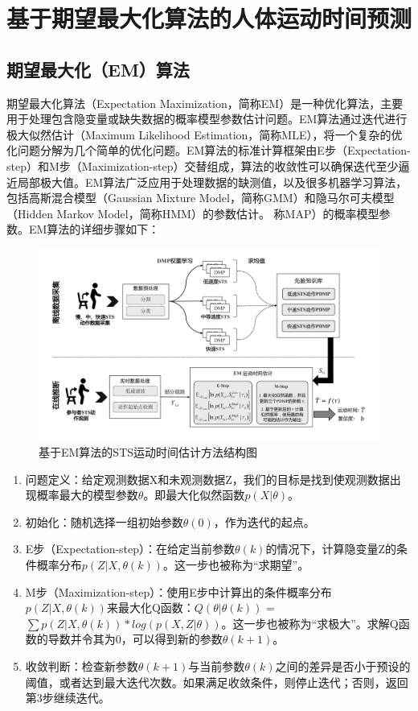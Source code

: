 \section{基于期望最大化算法的人体运动时间预测}
\subsection{期望最大化（EM）算法}
期望最大化算法（Expectation Maximization，简称EM）是一种优化算法，主要用于处理包含隐变量或缺失数据的概率模型参数估计问题。EM算法通过迭代进行极大似然估计（Maximum Likelihood Estimation，简称MLE），将一个复杂的优化问题分解为几个简单的优化问题。EM算法的标准计算框架由E步（Expectation-step）和M步（Maximization-step）交替组成，算法的收敛性可以确保迭代至少逼近局部极大值。EM算法广泛应用于处理数据的缺测值，以及很多机器学习算法，包括高斯混合模型（Gaussian Mixture Model，简称GMM）和隐马尔可夫模型（Hidden Markov Model，简称HMM）的参数估计。
称MAP）的概率模型参数。EM算法的详细步骤如下：

\begin{figure}[!t]
    \centering\includegraphics[width=1\textwidth]{figures/4-Fig-3.pdf}
    \caption{基于EM算法的STS运动时间估计方法结构图}
    \label{fig:4-3}
\end{figure}

\begin{enumerate}
\item 问题定义：给定观测数据X和未观测数据Z，我们的目标是找到使观测数据出现概率最大的模型参数$θ$。即最大化似然函数$p(X|θ)$。

\item 初始化：随机选择一组初始参数$θ(0)$，作为迭代的起点。

\item E步（Expectation-step）：在给定当前参数$θ(k)$的情况下，计算隐变量Z的条件概率分布$p(Z|X, θ(k))$。这一步也被称为“求期望”。

\item M步（Maximization-step）：使用E步中计算出的条件概率分布$p(Z|X, θ(k))$来最大化Q函数：$Q(θ|θ(k))$ = $\sum p(Z|X, θ(k)) * log(p(X, Z|θ))$。这一步也被称为``求极大''。求解Q函数的导数并令其为0，可以得到新的参数$θ(k+1)$。

\item 收敛判断：检查新参数$θ(k+1)$与当前参数$θ(k)$之间的差异是否小于预设的阈值，或者达到最大迭代次数。如果满足收敛条件，则停止迭代；否则，返回第3步继续迭代。
\end{enumerate}


